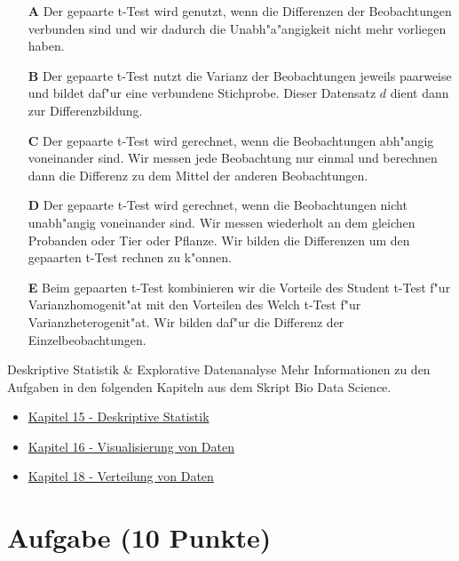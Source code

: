 \documentclass[a4paper, 10pt]{scrartcl}\usepackage[]{graphicx}\usepackage[]{xcolor}
\begin{document}
\begin{enumerate}
\item [\textbf{A} \msquare] Der gepaarte t-Test wird genutzt, wenn die Differenzen der Beobachtungen verbunden sind und wir dadurch die Unabh{"a}{"a}ngigkeit nicht mehr vorliegen haben.
\item [\textbf{B} \msquare] Der gepaarte t-Test nutzt die Varianz der Beobachtungen jeweils paarweise und bildet daf{"u}r eine verbundene Stichprobe. Dieser Datensatz $d$ dient dann zur Differenzbildung.
\item [\textbf{C} \msquare] Der gepaarte t-Test wird gerechnet, wenn die Beobachtungen abh{"a}ngig voneinander sind. Wir messen jede Beobachtung nur einmal und berechnen dann die Differenz zu dem Mittel der anderen Beobachtungen.
\item [\textbf{D} \msquare] Der gepaarte t-Test wird gerechnet, wenn die Beobachtungen nicht unabh{"a}ngig voneinander sind. Wir messen wiederholt an dem gleichen Probanden oder Tier oder Pflanze. Wir bilden die Differenzen um den gepaarten t-Test rechnen zu k{"o}nnen.
\item [\textbf{E} \msquare] Beim gepaarten t-Test kombinieren wir die Vorteile des Student t-Test f{"u}r Varianzhomogenit{"a}t mit den Vorteilen des Welch t-Test f{"u}r Varianzheterogenit{"a}t. Wir bilden daf{"u}r die Differenz der Einzelbeobachtungen.
\end{enumerate}
\clearpage
\begin{graybox}{Deskriptive Statistik \& Explorative Datenanalyse}
Mehr Informationen zu den Aufgaben in den folgenden Kapiteln aus dem Skript Bio Data Science.
  \begin{itemize}
  \item \href{https://jkruppa.github.io/eda-descriptive.html}{Kapitel 15 - Deskriptive Statistik}
  \item \href{https://jkruppa.github.io/eda-ggplot.html}{Kapitel 16 - Visualisierung von Daten}
  \item \href{https://jkruppa.github.io/eda-distribution.html}{Kapitel 18 - Verteilung von Daten}
  \end{itemize}
\end{graybox}
\clearpage

\section{Aufgabe \hfill (10 Punkte)}
\end{document}
